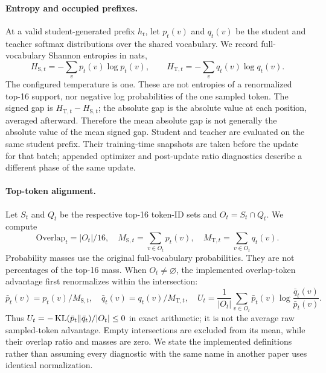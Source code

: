 \paragraph{Entropy and occupied prefixes.}
At a valid student-generated prefix $h_t$, let $p_t(v)$ and $q_t(v)$ be the student and teacher softmax distributions over the shared vocabulary. We record full-vocabulary Shannon entropies in nats,
\begin{equation}
 H_{\mathrm S,t}=-\sum_v p_t(v)\log p_t(v),\qquad
 H_{\mathrm T,t}=-\sum_v q_t(v)\log q_t(v).
\end{equation}
The configured temperature is one. These are not entropies of a renormalized top-16 support, nor negative log probabilities of the one sampled token. The signed gap is $H_{\mathrm T,t}-H_{\mathrm S,t}$; the absolute gap is the absolute value at each position, averaged afterward. Therefore the mean absolute gap is not generally the absolute value of the mean signed gap. Student and teacher are evaluated on the same student prefix. Their training-time snapshots are taken before the update for that batch; appended optimizer and post-update ratio diagnostics describe a different phase of the same update.

\paragraph{Top-token alignment.}
Let $S_t$ and $Q_t$ be the respective top-16 token-ID sets and $O_t=S_t\cap Q_t$. We compute
\begin{equation}
 \mathrm{Overlap}_t=|O_t|/16,\quad
 M_{\mathrm S,t}=\sum_{v\in O_t}p_t(v),\quad
 M_{\mathrm T,t}=\sum_{v\in O_t}q_t(v).
\end{equation}
Probability masses use the original full-vocabulary probabilities. They are not percentages of the top-16 mass. When $O_t\ne\varnothing$, the implemented overlap-token advantage first renormalizes within the intersection:
\begin{equation}
 \bar p_t(v)=p_t(v)/M_{\mathrm S,t},\quad
 \bar q_t(v)=q_t(v)/M_{\mathrm T,t},\quad
 U_t=\frac{1}{|O_t|}\sum_{v\in O_t}\bar p_t(v)
       \log\frac{\bar q_t(v)}{\bar p_t(v)}.
\end{equation}
Thus $U_t=-\operatorname{KL}(\bar p_t\Vert\bar q_t)/|O_t|\le0$ in exact arithmetic; it is not the average raw sampled-token advantage. Empty intersections are excluded from its mean, while their overlap ratio and masses are zero. We state the implemented definitions rather than assuming every diagnostic with the same name in another paper uses identical normalization.

